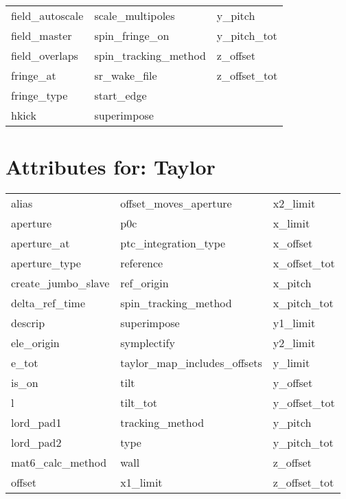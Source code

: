 \begin{tabular}{lll}
field_autoscale                & scale_multipoles            & y_pitch                     \\
field_master                & spin_fringe_on              & y_pitch_tot                 \\
field_overlaps              & spin_tracking_method        & z_offset                    \\
fringe_at                   & sr_wake_file                & z_offset_tot                \\
fringe_type                 & start_edge                  &                             \\
hkick                       & superimpose                 &                             \\
 \bottomrule
 \end{tabular}
 \vfill
 
 \section{Attributes for: Taylor}
 \label{s:list.taylor}
 
 \begin{tabular}{lll} \toprule
alias                       & offset_moves_aperture       & x2_limit                    \\
aperture                    & p0c                         & x_limit                     \\
aperture_at                 & ptc_integration_type        & x_offset                    \\
aperture_type               & reference                   & x_offset_tot                \\
create_jumbo_slave          & ref_origin                  & x_pitch                     \\
delta_ref_time              & spin_tracking_method        & x_pitch_tot                 \\
descrip                     & superimpose                 & y1_limit                    \\
ele_origin                  & symplectify                 & y2_limit                    \\
e_tot                       & taylor_map_includes_offsets & y_limit                     \\
is_on                       & tilt                        & y_offset                    \\
l                           & tilt_tot                    & y_offset_tot                \\
lord_pad1                   & tracking_method             & y_pitch                     \\
lord_pad2                   & type                        & y_pitch_tot                 \\
mat6_calc_method            & wall                        & z_offset                    \\
offset                      & x1_limit                    & z_offset_tot                \\
 \bottomrule
 \end{tabular}
 \vfill
 

